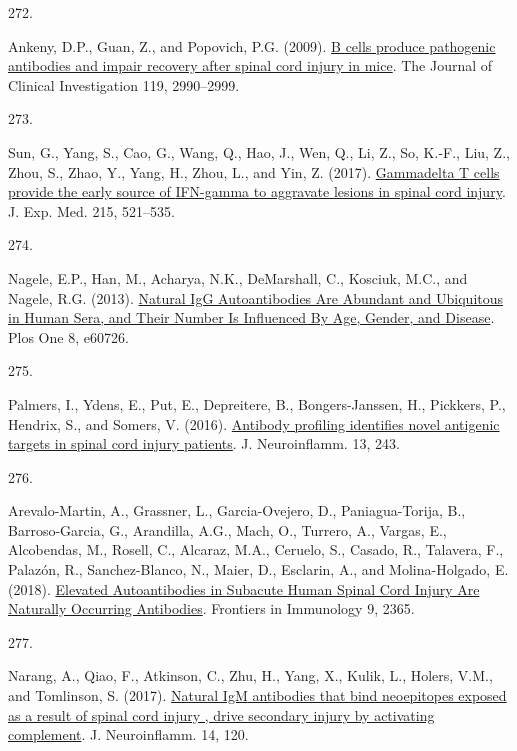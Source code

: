 \documentclass[
]{article}
\newlength{\cslhangindent}
\newlength{\csllabelwidth}
\newlength{\cslentryspacingunit} %
\newenvironment{CSLReferences}[2] %
 {%
  \setlength{\parindent}{0pt}
  \ifodd #1
  \let\oldpar\par
  \def\par{\hangindent=\cslhangindent\oldpar}
  \fi
  \setlength{\parskip}{#2\cslentryspacingunit}
 }%
 {}
\newcommand{\CSLLeftMargin}[1]{\parbox[t]{\csllabelwidth}{#1}}
\newcommand{\CSLRightInline}[1]{\parbox[t]{\linewidth - \csllabelwidth}{#1}\break}
\begin{document}
\begin{CSLReferences}{0}{0}
\leavevmode{}%
\CSLLeftMargin{272. }
\CSLRightInline{Ankeny, D.P., Guan, Z., and Popovich, P.G. (2009). \href{https://doi.org/10.1172/JCI39780}{B cells produce pathogenic antibodies and impair recovery after spinal cord injury in mice}. The Journal of Clinical Investigation 119, 2990--2999.}

\leavevmode{}%
\CSLLeftMargin{273. }
\CSLRightInline{Sun, G., Yang, S., Cao, G., Wang, Q., Hao, J., Wen, Q., Li, Z., So, K.-F., Liu, Z., Zhou, S., Zhao, Y., Yang, H., Zhou, L., and Yin, Z. (2017). \href{https://doi.org/10.1084/jem.20170686}{Gammadelta {T} cells provide the early source of {IFN-gamma} to aggravate lesions in spinal cord injury}. J. Exp. Med. 215, 521--535.}

\leavevmode{}%
\CSLLeftMargin{274. }
\CSLRightInline{Nagele, E.P., Han, M., Acharya, N.K., DeMarshall, C., Kosciuk, M.C., and Nagele, R.G. (2013). \href{https://doi.org/10.1371/journal.pone.0060726}{Natural {IgG Autoantibodies Are Abundant} and {Ubiquitous} in {Human Sera}, and {Their Number Is Influenced By Age}, {Gender}, and {Disease}}. Plos One 8, e60726.}

\leavevmode{}%
\CSLLeftMargin{275. }
\CSLRightInline{Palmers, I., Ydens, E., Put, E., Depreitere, B., Bongers-Janssen, H., Pickkers, P., Hendrix, S., and Somers, V. (2016). \href{https://doi.org/10.1186/s12974-016-0713-5}{Antibody profiling identifies novel antigenic targets in spinal cord injury patients}. J. Neuroinflamm. 13, 243.}

\leavevmode{}%
\CSLLeftMargin{276. }
\CSLRightInline{Arevalo-Martin, A., Grassner, L., Garcia-Ovejero, D., Paniagua-Torija, B., Barroso-Garcia, G., Arandilla, A.G., Mach, O., Turrero, A., Vargas, E., Alcobendas, M., Rosell, C., Alcaraz, M.A., Ceruelo, S., Casado, R., Talavera, F., Palazón, R., Sanchez-Blanco, N., Maier, D., Esclarin, A., and Molina-Holgado, E. (2018). \href{https://doi.org/10.3389/fimmu.2018.02365}{Elevated {Autoantibodies} in {Subacute Human Spinal Cord Injury Are Naturally Occurring Antibodies}}. Frontiers in Immunology 9, 2365.}

\leavevmode{}%
\CSLLeftMargin{277. }
\CSLRightInline{Narang, A., Qiao, F., Atkinson, C., Zhu, H., Yang, X., Kulik, L., Holers, V.M., and Tomlinson, S. (2017). \href{https://doi.org/10.1186/s12974-017-0894-6}{Natural {IgM} antibodies that bind neoepitopes exposed as a result of spinal cord injury , drive secondary injury by activating complement}. J. Neuroinflamm. 14, 120.}


\end{CSLReferences}
\end{document}
